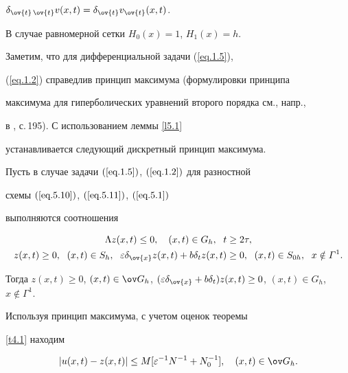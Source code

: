 $\delta_{\ov{t}\,\ov{t}} v(x, t)=\delta_{\ov{t}} v_{\ov{t}}(x, t)$.


В случае равномерной сетки $H_0(x)=1$, $H_1(x)=h$.





Заметим, что для дифференциальной задачи (\ref{eq.1.5}),


(\ref{eq.1.2}) справедлив принцип максимума (формулировки принципа


максимума для гиперболических уравнений второго порядка см., \mbox{напр.,}


в \cite{11}, с.\,195). С использованием леммы \ref{l5.1}


устанавливается следующий дискретный принцип максимума.





\begin{lems} \label{l5.2}


Пусть в случае задачи $(\ref{eq.1.5})$, $(\ref{eq.1.2})$ для разностной


схемы $(\ref{eq.5.10})$, $(\ref{eq.5.11})$, $(\ref{eq.5.1})$


выполняются соотношения\vspace{-1mm}


\begin{gather*}


\Lambda z(x, t)\le 0, \quad (x, t)\in G_h, \ \; t\ge 2\tau,\\


z(x, t)\ge 0, \ \; (x, t)\in S_h,\ \;


\varepsilon \delta_{\ov{x}} z(x,t)+b\delta_t z(x,t)\ge 0, \ \; (x, t)\in


S_{0h}, \ \; x\notin \varGamma^1.


\end{gather*}


Тогда $z(x,t)\ge 0$, $(x,t)\in \ov G_h$, $(\varepsilon\delta_{\ov{x}}+


b\delta_t)z(x,t)\ge 0$, $(x, t)\in G_h$, $x\notin \varGamma^1$.


\end{lems}





Используя принцип максимума, с учетом оценок теоремы


\ref{t4.1} находим


\begin{equation}


\label{eq.5.12}


|u(x, t)-z(x, t)|\le M [\varepsilon^{-1} N^{-1}+N_0^{-1}],


\quad (x, t)\in \ov G_h.


\end{equation}


